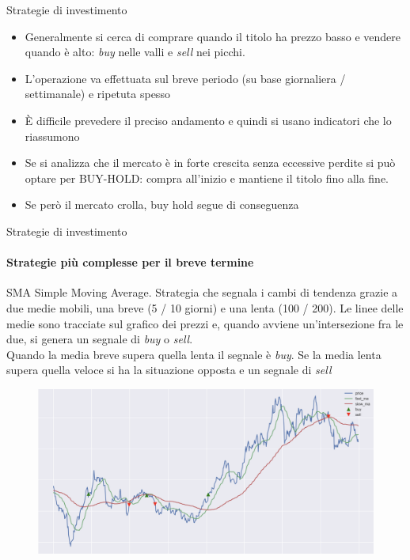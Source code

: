 \documentclass{beamer}
\begin{document}
\begin{frame}{Strategie di investimento}
\begin{itemize}
    \item Generalmente si cerca di comprare quando il titolo ha prezzo basso e vendere quando è alto: \textit{buy} nelle valli e \textit{sell} nei picchi. 
    \item L'operazione va effettuata sul breve periodo (su base giornaliera / settimanale) e ripetuta spesso
    \item È difficile prevedere il preciso andamento e quindi si usano indicatori che lo riassumono
    \item Se si analizza che il mercato è in forte crescita senza eccessive perdite si può optare per BUY-HOLD: compra all'inizio e mantiene il titolo fino alla fine.
    \item Se però il mercato crolla, buy hold segue di conseguenza
\end{itemize}
\end{frame}

\begin{frame}{Strategie di investimento}
\framesubtitle{Strategie più complesse per il breve termine}
\begin{itemize}
    \begin{block}{SMA}
    Simple Moving Average. Strategia che segnala i cambi di tendenza grazie a due medie mobili, una breve (5 / 10 giorni) e una lenta (100 / 200). Le linee delle medie sono tracciate sul grafico dei prezzi e, quando avviene un'intersezione fra le due, si genera un segnale di \textit{buy} o \textit{sell}.\\ Quando la media breve supera quella lenta il segnale è \textit{buy}. Se la media lenta supera quella veloce si ha la situazione opposta e un segnale di \textit{sell}
    \end{block}
    \begin{figure}
        \centering
        \includegraphics[width=.5\linewidth]{moving_avg2}
    \end{figure}
\end{itemize}
\end{frame}
\end{document}
